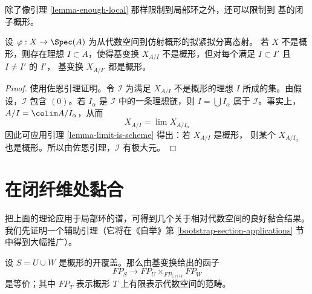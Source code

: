 \noindent
除了像引理 \ref{lemma-enough-local} 那样限制到局部环之外，还可以限制到
基的闭子概形。

\begin{lemma}
\label{lemma-maximal-ideal}
设 $\varphi : X \to \Spec(A)$ 为从代数空间到仿射概形的拟紧拟分离态射。
若 $X$ 不是概形，则存在理想 $I \subset A$，使得基变换 $X_{A/I}$
不是概形，但对每个满足 $I \subset I'$ 且 $I \not = I'$ 的 $I'$，
基变换 $X_{A/I'}$ 都是概形。
\end{lemma}

\begin{proof}
使用佐恩引理证明。令 $\mathcal{I}$ 为满足 $X_{A/I}$ 不是概形的理想 $I$
所成的集。由假设，$\mathcal{I}$ 包含 $(0)$。若 $I_\alpha$ 是
$\mathcal{I}$ 中的一条理想链，则 $I = \bigcup I_\alpha$ 属于
$\mathcal{I}$。事实上，$A/I = \colim A/I_\alpha$，从而
$$
X_{A/I} = \lim X_{A/I_\alpha}
$$
因此可应用引理 \ref{lemma-limit-is-scheme} 得出：若 $X_{A/I}$ 是概形，
则某个 $X_{A/I_\alpha}$ 也是概形。所以由佐恩引理，$\mathcal{I}$ 有极大元。
\end{proof}






\section{在闭纤维处黏合}
\label{section-change-over-closed-points}

\noindent
把上面的理论应用于局部环的谱，可得到几个关于相对代数空间的良好黏合结果。
我们先证明一个辅助引理（它将在《自举》第
\ref{bootstrap-section-applications} 节中得到大幅推广）。

\begin{lemma}
\label{lemma-relative-glueing}
设 $S = U \cup W$ 是概形的开覆盖。那么由基变换给出的函子
$$
FP_S \longrightarrow FP_U \times_{FP_{U \cap W}} FP_W
$$
是等价；其中 $FP_T$ 表示概形 $T$ 上有限表示代数空间的范畴。
\end{lemma}

